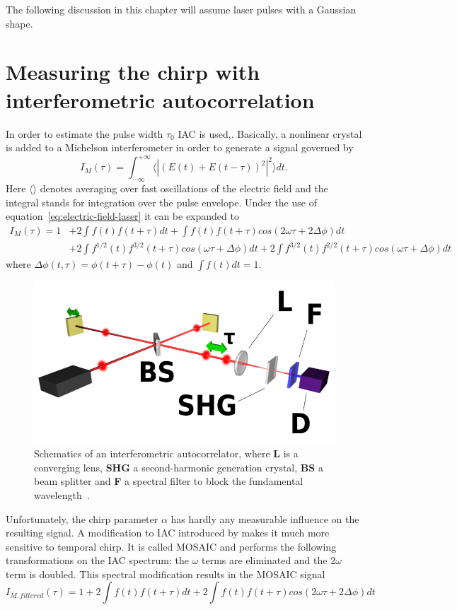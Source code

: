 The following discussion in this chapter will assume laser pulses with a Gaussian shape. 


\section{Measuring the chirp with interferometric autocorrelation}

In order to estimate the pulse width $\tau_0$ \ac{IAC} is used,.
Basically, a nonlinear crystal is added to a Michelson interferometer in order to generate a signal governed by
\begin{equation}
\label{eq:i-m-integral}
I_M(\tau) = \int_{-\infty}^{+\infty}\langle|(E(t)+E(t-\tau))^2|^2\rangle dt.
\end{equation}
Here $\langle \rangle$ denotes averaging over fast oscillations of the electric field and the integral stands for integration over the pulse envelope.
Under the use of equation~\ref{eq:electric-field-laser} it can be expanded to
\begin{align}
I_M(\tau) = 1 &+ 2 \int f(t) f(t + \tau) dt + \int f(t) f(t + \tau) cos(2 \omega \tau + 2 \Delta \phi) dt \nonumber\\
&+ 2 \int f^{1/2}(t) f^{3/2}(t + \tau) cos(\omega \tau + \Delta \phi) dt + 2 \int f^{3/2}(t) f^{2/2}(t + \tau) cos(\omega \tau + \Delta \phi) dt
\end{align}
where $\Delta \phi(t, \tau) = \phi(t + \tau) - \phi(t)$ and $\int f(t) dt = 1$.
\begin{figure}[H]
	\centering
	\includegraphics[width=0.8\linewidth]{figures/chirp/Optical-interferometric-autocorrelation-setup.png}
	\caption{Schematics of an interferometric autocorrelator, where \textbf{L} is a converging lens, \textbf{SHG} a second-harmonic generation crystal, \textbf{BS} a beam splitter and \textbf{F} a spectral filter to block the fundamental wavelength~\cite{noauthor_optical_nodate}.}
	\label{fig:optical-field-autocorrelation-setup}
\end{figure}
Unfortunately, the chirp parameter $\alpha$ has hardly any measurable influence on the resulting signal.
A modification to \ac{IAC} introduced by \textcite{hirayama_real-time_2002} makes it much more sensitive to temporal chirp.
It is called \ac{MOSAIC} and performs the following transformations on the \ac{IAC} spectrum: the $\omega$ terms are eliminated and the $2\omega$ term is doubled.
This spectral modification results in the \ac{MOSAIC} signal
\begin{equation}
\label{eq:i-m-filtered}
I_{M, filtered}(\tau) = 1 + 2 \int f(t) f(t + \tau) dt + 2 \int f(t) f(t + \tau) cos(2\omega \tau + 2\Delta \phi) dt
\end{equation}

